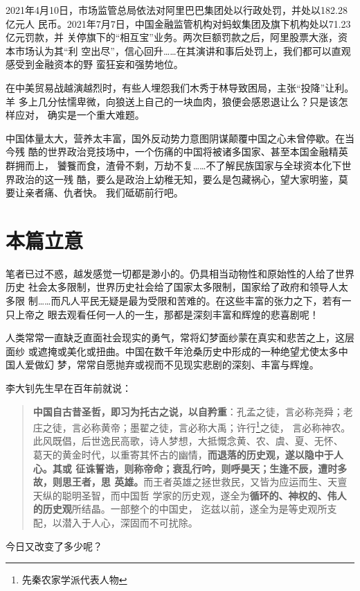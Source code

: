 2021年4月10日，市场监管总局依法对阿里巴巴集团处以行政处罚，并处以182.28亿元人
民币。2021年7月7日，中国金融监管机构对蚂蚁集团及旗下机构处以71.23亿元罚款，并
关停旗下的“相互宝”业务。两次巨额罚款之后，阿里股票大涨，资本市场认为其“利
空出尽”，信心回升……在其演讲和事后处罚上，我们都可以直观感受到金融资本的野
蛮狂妄和强势地位。


在中美贸易战越演越烈时，有些人埋怨我们木秀于林导致困局，主张“投降”让利。羊
多上几分怯懦卑微，向狼送上自己的一块血肉，狼便会感恩退让么？只是该怎样应对，
确实是一个重大难题。

中国体量太大，营养太丰富，国外反动势力意图阴谋颠覆中国之心未曾停歇。在当今残
酷的世界政治竞技场中，一个伤痛的中国将被诸多国家、甚至本国金融精英群拥而上，
饕餮而食，渣骨不剩，万劫不复……不了解民族国家与全球资本化下世界政治的这一残
酷，要么是政治上幼稚无知，要么是包藏祸心，望大家明鉴，莫要让亲者痛、仇者快。
我们砥砺前行吧。

\section{本篇立意}

笔者已过不惑，越发感觉一切都是渺小的。仍具相当动物性和原始性的人给了世界历史
社会太多限制，世界历史社会给了国家太多限制，国家给了政府和领导人太多限
制……而凡人平民无疑是最为受限和苦难的。在这些丰富的张力之下，若有一只上帝之
眼去观看任何一人的一生，那都是深刻丰富和辉煌的悲喜剧呢！


人类常常一直缺乏直面社会现实的勇气，常将幻梦面纱蒙在真实和悲苦之上，这层面纱
或遮掩或美化或扭曲。中国在数千年沧桑历史中形成的一种绝望尤使太多中国人爱做幻
梦，常常自愿抛弃或视而不见现实悲剧的深刻、丰富与辉煌。

李大钊先生早在百年前就说：
\begin{quotation}
  \textbf{中国自古昔圣哲，即习为托古之说，以自矜重}：孔孟之徒，言必称尧舜；老
  庄之徒，言必称黄帝；墨翟之徒，言必称大禹；许行\footnote{先秦农家学派代表人物}之徒，
  言必称神农。此风既倡，后世逸民高歌，诗人梦想，大抵慨念黄、农、虞、夏、无怀、
  葛天的黄金时代，以重寄其怀古的幽情，\textbf{而退落的历史观，遂以隐中于人心。其或
    征诛誓诰，则称帝命；衰乱行吟，则呼昊天；生逢不辰，遭时多故，则思王者，思
    英雄。}而王者英雄之拯世救民，又皆为应运而生、天亶天纵的聪明圣智，而中国哲
  学家的历史观，遂全为\textbf{循环的、神权的、伟人的历史观}所结晶。一部整个的中国史，
  迄兹以前，遂全为是等史观所支配，以潜入于人心，深固而不可扰除。
\end{quotation}
今日又改变了多少呢？

